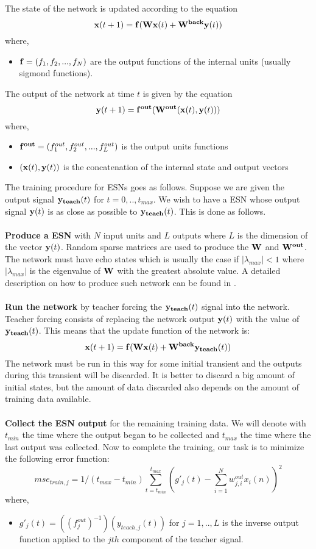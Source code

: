 \documentclass[10pt]{article}
\begin{document}
The state of the network is updated according to the equation
\[
{\bf x}(t+1)={\bf f}({\bf Wx}(t) + {\bf W^{back}y}(t))
\]
where,
\begin{itemize}
  \item ${\bf f}=(f_1,f_2,...,f_N)$ are the output functions of the internal units (usually sigmond functions).
\end{itemize}
The output of the network at time $t$ is given by the equation
\[
{\bf y}(t+1)={\bf f^{out}}({\bf W^{out}}({\bf x}(t),{\bf y}(t)))
\]
where, 
\begin{itemize}
  \item ${\bf f^{out}}=(f_1^{out},f_2^{out},...,f_L^{out})$ is the output units functions 
  \item $({\bf x}(t),{\bf y}(t))$ is the concatenation of the internal state and output vectors
\end{itemize}
The training procedure for ESNs goes as follows. Suppose we are given the output signal ${\bf y_{teach}}(t)$ for $t=0,..,t_{max}$. We wish to have a ESN whose output signal ${\bf y}(t)$ is as close as possible to ${\bf y_{teach}}(t)$. This is done as follows.\\\\
{\bf Produce a ESN} with $N$ input units and $L$ outputs where $L$ is the dimension of the vector ${\bf y}(t)$. Random sparse matrices are used to produce the ${\bf W}$ and ${\bf W^{out}}$. The network must have echo states which is usually the case if $|\lambda_{max}| < 1$ where $|\lambda_{max}|$ is the eigenvalue of ${\bf W}$ with the greatest absolute value. A detailed description on how to produce such network can be found in \cite{JaegerESNTutorial}.\\\\
{\bf Run the network} by teacher forcing the ${\bf y_{teach}}(t)$ signal into the network. Teacher forcing consists of replacing the network output ${\bf y}(t)$ with the value of ${\bf y_{teach}}(t)$. This means that the update function of the network is:
\[
{\bf x}(t+1)={\bf f}({\bf Wx}(t)+{\bf W^{back}y_{teach}}(t))
\]
The network must be run in this way for some initial transient and the outputs during this transient will be discarded. It is better to discard a big amount of initial states, but the amount of data discarded also depends on the amount of training data available.\\\\
{\bf Collect the ESN output} for the remaining training data. We will denote with $t_{min}$ the time where the output began to be collected and $t_{max}$ the time where the last output was collected. Now to complete the training, our task is to minimize the following error function:
\[
mse_{train,j} = 1/(t_{max}-t_{min})\sum_{t=t_{min}}^{t_{max}}(g'_j(t) - \sum_{i=1}^{N}w_{j,i}^{out}x_i(n))^2
\]
where, 
\begin{itemize}
  \item $g'_j(t)=((f_j^{out})^{-1})(y_{teach,j}(t))$ for $j=1,..,L$ is the inverse output function applied to the $jth$ component of the teacher signal. 
\end{itemize}
\end{document}
